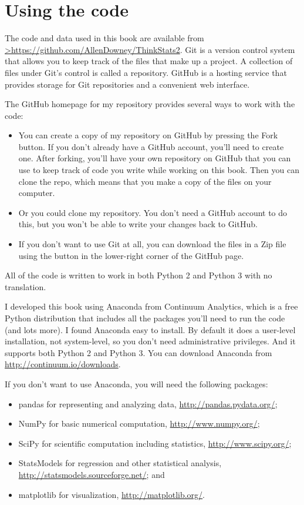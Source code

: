 \documentclass[]{book}
\providecommand{\tightlist}{%
  \setlength{\itemsep}{0pt}\setlength{\parskip}{0pt}}
\begin{document}
\hypertarget{using-the-code}{%
\section{Using the code}\label{using-the-code}}

The code and data used in this book are available from \href{https://github.com/AllenDowney/ThinkStats2}{\textgreater{}https://github.com/AllenDowney/ThinkStats2}. Git is a version control system that allows you to keep track of the files that make up a project. A collection of files under Git's control is called a repository. GitHub is
a hosting service that provides storage for Git repositories and a convenient web interface.

The GitHub homepage for my repository provides several ways to work with
the code:

\begin{itemize}
\tightlist
\item
  You can create a copy of my repository on GitHub by pressing the
  Fork button. If you don't already have a GitHub account, you'll need to create one. After forking, you'll have your own repository on GitHub that you can use to keep track of code you write while working on this book. Then you can clone the repo, which means that you make a copy of the files on your computer.
\item
  Or you could clone my repository. You don't need a GitHub account to
  do this, but you won't be able to write your changes back to GitHub.
\item
  If you don't want to use Git at all, you can download the files in a
  Zip file using the button in the lower-right corner of the GitHub
  page.
\end{itemize}

All of the code is written to work in both Python 2 and Python 3 with no
translation.

I developed this book using Anaconda from Continuum Analytics, which is
a free Python distribution that includes all the packages you'll need to
run the code (and lots more). I found Anaconda easy to install. By
default it does a user-level installation, not system-level, so you
don't need administrative privileges. And it supports both Python 2 and
Python 3. You can download Anaconda from \url{http://continuum.io/downloads}.

If you don't want to use Anaconda, you will need the following packages:

\begin{itemize}
\tightlist
\item
  pandas for representing and analyzing data, \url{http://pandas.pydata.org/};
\item
  NumPy for basic numerical computation, \url{http://www.numpy.org/};
\item
  SciPy for scientific computation including statistics, \url{http://www.scipy.org/};
\item
  StatsModels for regression and other statistical analysis, \url{http://statsmodels.sourceforge.net/}; and
\item
  matplotlib for visualization, \url{http://matplotlib.org/}.
\end{itemize}
\end{document}
